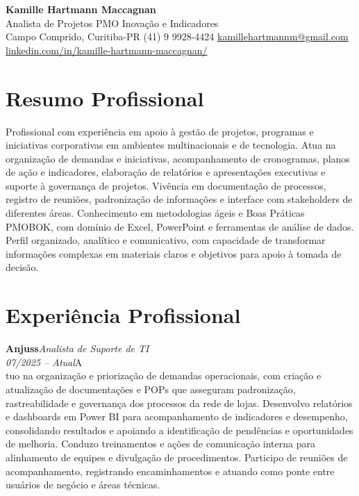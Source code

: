 \documentclass[11pt,a4paper]{article}
\newcommand{\cvrole}[4]{%
  \vspace{4pt}%
  {\bfseries\color{accentcolor}#1}\hfill{\itshape #2}\\[-2pt]%
  {\itshape #3}\hfill #4\\[6pt]%
}
\begin{document}
\begin{center}
  {\fontsize{20}{24}\selectfont\bfseries Kamille Hartmann Maccagnan}\\[8pt]
  {\large Analista de Projetos \textbar{} PMO \textbar{} Inovação e Indicadores}\\[10pt]
  Campo Comprido, Curitiba-PR \enspace\textbullet\enspace (41) 9 9928-4424 \enspace\textbullet\enspace
  \href{mailto:kamillehartmannm@gmail.com}{kamillehartmannm@gmail.com}\\[3pt]
  \href{https://linkedin.com/in/kamille-hartmann-maccagnan/}{linkedin.com/in/kamille-hartmann-maccagnan/}
\end{center}

\vspace{6pt}

\section{Resumo Profissional}

Profissional com experiência em apoio à gestão de projetos, programas e iniciativas corporativas em ambientes multinacionais e de tecnologia. Atua na organização de demandas e iniciativas, acompanhamento de cronogramas, planos de ação e indicadores, elaboração de relatórios e apresentações executivas e suporte à governança de projetos. Vivência em documentação de processos, registro de reuniões, padronização de informações e interface com stakeholders de diferentes áreas. Conhecimento em metodologias ágeis e Boas Práticas PMOBOK, com domínio de Excel, PowerPoint e ferramentas de análise de dados. Perfil organizado, analítico e comunicativo, com capacidade de transformar informações complexas em materiais claros e objetivos para apoio à tomada de decisão.

\section{Experiência Profissional}

\cvrole{Anjuss}{Analista de Suporte de TI}{07/2025 -- Atual}

Atuo na organização e priorização de demandas operacionais, com criação e atualização de documentações e POPs que asseguram padronização, rastreabilidade e governança dos processos da rede de lojas. Desenvolvo relatórios e dashboards em Power BI para acompanhamento de indicadores e desempenho, consolidando resultados e apoiando a identificação de pendências e oportunidades de melhoria. Conduzo treinamentos e ações de comunicação interna para alinhamento de equipes e divulgação de procedimentos. Participo de reuniões de acompanhamento, registrando encaminhamentos e atuando como ponte entre usuários de negócio e áreas técnicas.
\end{document}
